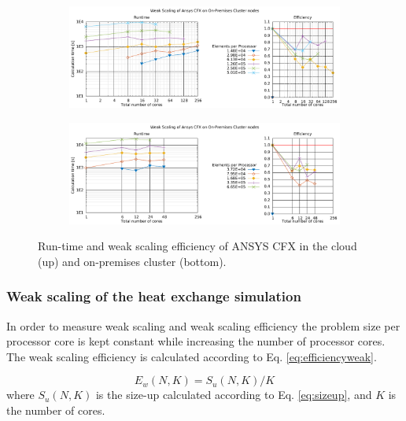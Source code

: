 \documentclass[a4paper,twoside]{article}
\begin{document}
\begin{figure}

	\begin{subfigure}
		\centering
		\includegraphics[width=0.8\linewidth]{gplt-a8-weak-pipe}	
	\end{subfigure}

	\begin{subfigure}
		\centering
		\includegraphics[width=0.8\linewidth]{gplt-hsr-weak-pipe}
	\end{subfigure}	
	\caption{Run-time and weak scaling efficiency of ANSYS CFX in the cloud (up) and on-premises cluster (bottom).}	
	\label{fig:weakHSR}
\end{figure}

\twocolumn
 
\subsubsection{Weak scaling of the heat exchange simulation}

In order to measure weak scaling and weak scaling efficiency the problem size per processor core is kept constant while increasing the number of processor cores. The weak scaling efficiency is calculated according to Eq. \ref{eq:efficiencyweak}.

\begin{equation}
	\label{eq:efficiencyweak}
	E_w(N,K) = S_u(N,K) / K
\end{equation}
where $S_u(N,K)$ is the size-up calculated according to Eq. \ref{eq:sizeup}, and $K$ is the number of cores.
\end{document}

